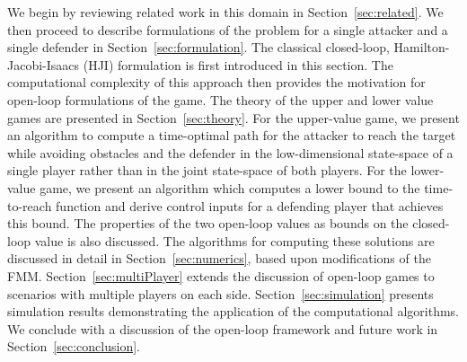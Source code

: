 We begin by reviewing related work in this domain in Section~\ref{sec:related}.  We then proceed to describe formulations of the problem for a single attacker and a single defender in Section~\ref{sec:formulation}. The classical closed-loop, Hamilton-Jacobi-Isaacs (HJI) formulation is first introduced in this section. The computational complexity of this approach then provides the motivation for open-loop formulations of the game.
The theory of the upper and lower value games are presented in Section~\ref{sec:theory}.
For the upper-value game, we present an algorithm to compute a time-optimal path for the attacker to reach the target while avoiding obstacles and the defender in the low-dimensional state-space of a single player rather than in the joint state-space of both players. 
For the lower-value game, we present an algorithm which computes a lower bound to the time-to-reach function and derive control inputs for a defending player that achieves this bound.
The properties of the two open-loop values as bounds on the closed-loop value is also discussed.
The algorithms for computing these solutions are discussed in detail in Section~\ref{sec:numerics}, based upon modifications of the FMM.
Section~\ref{sec:multiPlayer} extends the discussion of open-loop games to scenarios with multiple players on each side.
Section~\ref{sec:simulation} presents simulation results demonstrating the application of the computational algorithms.  We conclude with a discussion of the open-loop framework and future work in Section~\ref{sec:conclusion}.